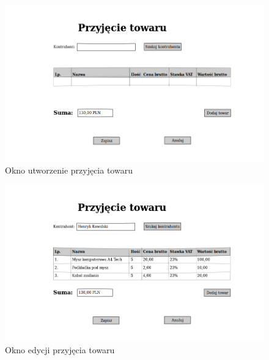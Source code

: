 \begin{figure}[!htb]
  \begin{center}
    \includegraphics[scale=0.45]{../img/interfejs/utworzenie-przyjecia-towaru.png}
  \end{center}
  \caption{Okno utworzenie przyjęcia towaru}
\end{figure}
\FloatBarrier

\begin{figure}[!htb]
  \begin{center}
    \includegraphics[scale=0.45]{../img/interfejs/edycja-przyjecia-towaru.png}
  \end{center}
  \caption{Okno edycji przyjęcia towaru}
\end{figure}
\FloatBarrier

